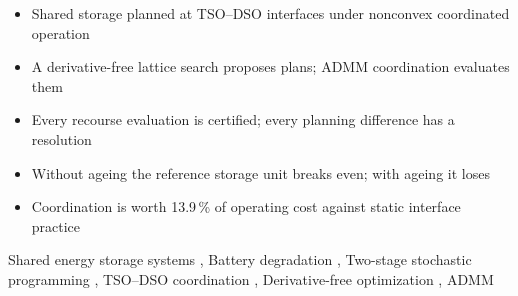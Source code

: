 \begin{itemize}
    \item Shared storage planned at TSO--DSO interfaces under nonconvex coordinated operation     %
    \item A derivative-free lattice search proposes plans; ADMM coordination evaluates them       %
    \item Every recourse evaluation is certified; every planning difference has a resolution      %
    \item Without ageing the reference storage unit breaks even; with ageing it loses             %
    \item Coordination is worth 13.9\,\% of operating cost against static interface practice       %
\end{itemize}

\begin{keyword}
    Shared energy storage systems \sep
    Battery degradation \sep
    Two-stage stochastic programming \sep
    TSO--DSO coordination \sep
    Derivative-free optimization \sep
    ADMM
\end{keyword}
